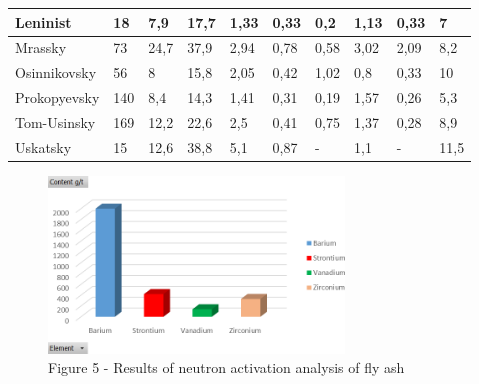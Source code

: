 \begin{table}[H]
\begin{tabular}{|l|lllllllll|}
Leninist & \multicolumn{1}{l|}{18} & \multicolumn{1}{l|}{7,9} & \multicolumn{1}{l|}{17,7} & \multicolumn{1}{l|}{1,33} & \multicolumn{1}{l|}{0,33} & \multicolumn{1}{l|}{0,2} & \multicolumn{1}{l|}{1,13} & \multicolumn{1}{l|}{0,33} & 7 \\ \hline
Mrassky & \multicolumn{1}{l|}{73} & \multicolumn{1}{l|}{24,7} & \multicolumn{1}{l|}{37,9} & \multicolumn{1}{l|}{2,94} & \multicolumn{1}{l|}{0,78} & \multicolumn{1}{l|}{0,58} & \multicolumn{1}{l|}{3,02} & \multicolumn{1}{l|}{2,09} & 8,2 \\ \hline
Osinnikovsky & \multicolumn{1}{l|}{56} & \multicolumn{1}{l|}{8} & \multicolumn{1}{l|}{15,8} & \multicolumn{1}{l|}{2,05} & \multicolumn{1}{l|}{0,42} & \multicolumn{1}{l|}{1,02} & \multicolumn{1}{l|}{0,8} & \multicolumn{1}{l|}{0,33} & 10 \\ \hline
Prokopyevsky & \multicolumn{1}{l|}{140} & \multicolumn{1}{l|}{8,4} & \multicolumn{1}{l|}{14,3} & \multicolumn{1}{l|}{1,41} & \multicolumn{1}{l|}{0,31} & \multicolumn{1}{l|}{0,19} & \multicolumn{1}{l|}{1,57} & \multicolumn{1}{l|}{0,26} & 5,3 \\ \hline
Tom-Usinsky & \multicolumn{1}{l|}{169} & \multicolumn{1}{l|}{12,2} & \multicolumn{1}{l|}{22,6} & \multicolumn{1}{l|}{2,5} & \multicolumn{1}{l|}{0,41} & \multicolumn{1}{l|}{0,75} & \multicolumn{1}{l|}{1,37} & \multicolumn{1}{l|}{0,28} & 8,9 \\ \hline
Uskatsky & \multicolumn{1}{l|}{15} & \multicolumn{1}{l|}{12,6} & \multicolumn{1}{l|}{38,8} & \multicolumn{1}{l|}{5,1} & \multicolumn{1}{l|}{0,87} & \multicolumn{1}{l|}{-} & \multicolumn{1}{l|}{1,1} & \multicolumn{1}{l|}{-} & 11,5 \\ \hline
\end{tabular}
\end{table}

\begin{figure}[H]
	\centering
	\includegraphics[width=0.7\textwidth]{assets/1052}
	\caption*{Figure 5 - Results of neutron activation analysis of fly ash}
\end{figure}

